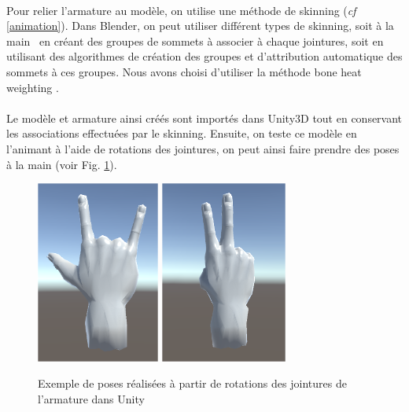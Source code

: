 \paragraph{}
Pour relier l'armature au modèle, on utilise une méthode de \og skinning \fg (\textit{cf} \ref{animation}). Dans Blender, on peut utiliser différent types de skinning, 
soit \og à la main \fg \ en créant des groupes de sommets à associer à chaque jointures, soit en utilisant des algorithmes de création des groupes et d'attribution automatique des 
sommets à ces groupes. Nous avons choisi d'utiliser la méthode \og bone heat weighting \fg \cite{baran2007automatic}. 

\paragraph{}
Le modèle et armature ainsi créés sont importés dans Unity3D tout en conservant les associations effectuées par le skinning. 
Ensuite, on teste ce modèle en l'animant à l'aide de rotations des jointures, on peut ainsi faire prendre des poses à la main (voir Fig. \ref{fig:poseMain}). 

\begin{figure}[!h]
	\centering
	\includegraphics[height=6cm]{images/HandPose1.png}
	\includegraphics[height=6cm]{images/HandPose2.png}
	\caption{Exemple de poses réalisées à partir de rotations des jointures de l'armature dans Unity}
	\label{fig:poseMain}
\end{figure}

